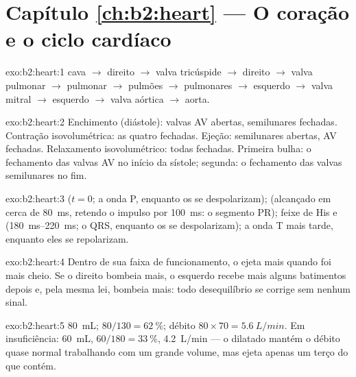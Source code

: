 \section*{Capítulo \ref{ch:b2:heart} --- O coração e o ciclo cardíaco}

\begin{solution}{exo:b2:heart:1}
 cava $\to$  direito $\to$ valva tricúspide $\to$ 
direito $\to$ valva pulmonar $\to$  pulmonar $\to$ pulmões
$\to$  pulmonares $\to$  esquerdo $\to$ valva mitral $\to$
 esquerdo $\to$ valva aórtica $\to$ aorta.
\end{solution}

\begin{solution}{exo:b2:heart:2}
Enchimento (diástole): valvas AV abertas, semilunares fechadas.
Contração isovolumétrica: as quatro fechadas. Ejeção: semilunares
abertas, AV fechadas. Relaxamento isovolumétrico: todas fechadas.
Primeira bulha: o fechamento das valvas AV no início da sístole;
segunda: o fechamento das valvas semilunares no fim.
\end{solution}

\begin{solution}{exo:b2:heart:3}
 ($t = 0$; a onda P, enquanto os  se despolarizam);
 (alcançado em cerca de \qty{80}{ms}, retendo o
impulso por \qty{100}{ms}: o segmento PR); feixe de His e  (\qtyrange{180}{220}{ms}; o QRS, enquanto os  se
despolarizam); a onda T mais tarde, enquanto eles se repolarizam.
\end{solution}

\begin{solution}{exo:b2:heart:4}
Dentro de sua faixa de funcionamento, o  ejeta mais quando
foi mais cheio. Se o  direito bombeia mais, o esquerdo recebe
mais alguns batimentos depois e, pela mesma lei, bombeia mais: todo
desequilíbrio se corrige sem nenhum sinal.
\end{solution}

\begin{solution}{exo:b2:heart:5}
 \qty{80}{mL};  $80/130 = \qty{62}{\%}$;
débito $80\times 70 = \qty{5.6}{L/min}$. Em insuficiência:
\qty{60}{mL}, $60/180 = \qty{33}{\%}$, \qty{4.2}{L/min} --- o 
dilatado mantém o débito quase normal trabalhando com um grande volume,
mas ejeta apenas um terço do que contém.
\end{solution}

